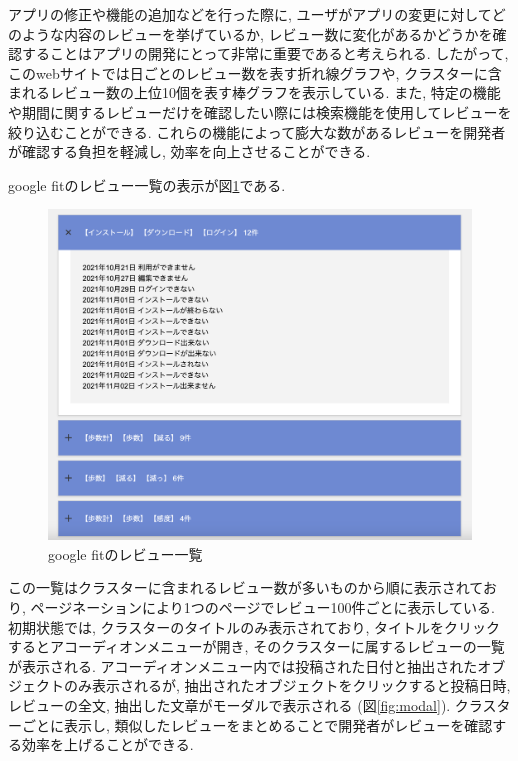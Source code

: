 アプリの修正や機能の追加などを行った際に, ユーザがアプリの変更に対してどのような内容のレビューを挙げているか, レビュー数に変化があるかどうかを確認することはアプリの開発にとって非常に重要であると考えられる. 
したがって, このwebサイトでは日ごとのレビュー数を表す折れ線グラフや, クラスターに含まれるレビュー数の上位10個を表す棒グラフを表示している. 
また, 特定の機能や期間に関するレビューだけを確認したい際には検索機能を使用してレビューを絞り込むことができる. 
これらの機能によって膨大な数があるレビューを開発者が確認する負担を軽減し, 効率を向上させることができる. 

google fitのレビュー一覧の表示が図\ref{fig:review_items}である. 

\begin{figure}[H]
  \centering
  \includegraphics[scale=0.3]
    {contents/images/review_items.png}
  \caption{google fitのレビュー一覧\label{fig:review_items}}
\end{figure}

この一覧はクラスターに含まれるレビュー数が多いものから順に表示されており, ページネーションにより1つのページでレビュー100件ごとに表示している. 
初期状態では, クラスターのタイトルのみ表示されており, タイトルをクリックするとアコーディオンメニューが開き, そのクラスターに属するレビューの一覧が表示される. アコーディオンメニュー内では投稿された日付と抽出されたオブジェクトのみ表示されるが, 抽出されたオブジェクトをクリックすると投稿日時, レビューの全文, 抽出した文章がモーダルで表示される (図\ref{fig:modal}). 
クラスターごとに表示し, 類似したレビューをまとめることで開発者がレビューを確認する効率を上げることができる. 

